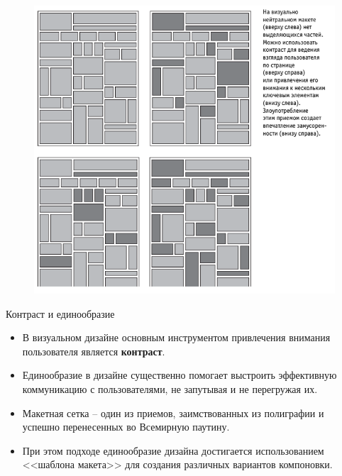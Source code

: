 \documentclass{beamer}
\begin{document}
\begin{frame}[t]
	\begin{figure}[h]
		\centering
		\includegraphics[scale=0.5]{images/lec05-pic02.png}
	\end{figure}
\end{frame}  

\begin{frame}[t]{Контраст и единообразие}
	\begin{itemize}
		\item В визуальном дизайне основным инструментом привлечения внимания пользователя является \textbf{контраст}.

		\item Единообразие в дизайне существенно помогает выстроить эффективную коммуникацию с пользователями, не запутывая и не перегружая их.

		\item Макетная сетка – один из приемов, заимствованных из полиграфии и успешно перенесенных во Всемирную паутину. 

		\item При этом подходе единообразие дизайна достигается использованием <<шаблона макета>> для создания различных вариантов компоновки.
	\end{itemize}
\end{frame}
\end{document}
